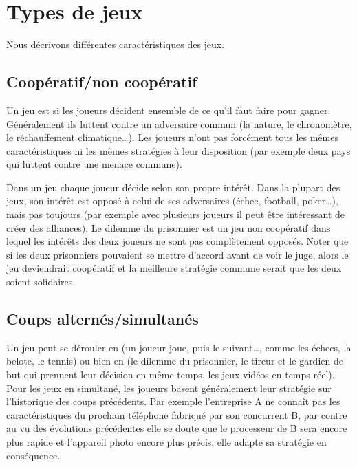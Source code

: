 \documentclass[11pt,class=report,crop=false]{standalone}
\begin{document}
	
\section{Types de jeux}

Nous décrivons différentes caractéristiques des jeux.

\subsection{Coopératif/non coopératif}

Un jeu est  si les joueurs décident ensemble de ce qu'il faut faire pour gagner. Généralement ils luttent contre un adversaire commun (la nature, le chronomètre, le réchauffement climatique\ldots). Les joueurs n'ont pas forcément tous les mêmes caractéristiques ni les mêmes stratégies à leur disposition (par exemple deux pays qui luttent contre une menace commune).

Dans un jeu  chaque joueur décide selon son propre intérêt. Dans la plupart des jeux, son intérêt est opposé à celui de ses adversaires (échec, football, poker\ldots), mais pas toujours (par exemple avec plusieurs joueurs il peut être intéressant de créer des alliances).
Le dilemme du prisonnier est un jeu non coopératif dans lequel les intérêts des deux joueurs ne sont pas complètement opposés.
Noter que si les deux prisonniers pouvaient se mettre d'accord avant de voir le juge, alors le jeu deviendrait coopératif et la meilleure stratégie commune serait que les deux soient solidaires.


\subsection{Coups alternés/simultanés}

Un jeu peut se dérouler en  (un joueur joue, puis le suivant\ldots, comme les échecs, la belote, le tennis) ou bien en  (le dilemme du prisonnier, le tireur et le gardien de but qui prennent leur décision en même temps, les jeux vidéos en temps réel). 
Pour les jeux en simultané, les joueurs basent généralement leur stratégie sur l'historique des coups précédents. Par exemple l'entreprise A ne connaît pas les caractéristiques du prochain téléphone fabriqué par son concurrent B, par contre au vu des évolutions précédentes elle se doute que le processeur de B sera encore plus rapide et l'appareil photo encore plus précis, elle adapte sa stratégie en conséquence.
\end{document}
